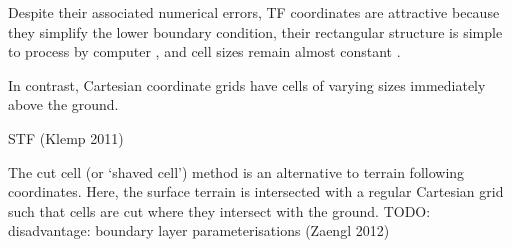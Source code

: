 
Despite their associated numerical errors, TF coordinates are attractive because they simplify the lower boundary condition, their rectangular structure is simple to process by computer \autocite{schaer2002}, and cell sizes remain almost constant \autocite{jebens2011}.

In contrast, Cartesian coordinate grids have cells of varying sizes immediately above the ground.  %

STF (Klemp 2011)

The cut cell (or `shaved cell')  method is an alternative to terrain following coordinates.  Here, the surface terrain is intersected with a regular Cartesian grid such that cells are cut where they intersect with the ground.  TODO: disadvantage: boundary layer parameterisations (Zaengl 2012)

